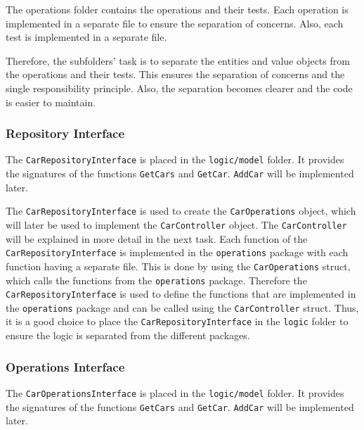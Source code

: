 The operations folder contains the operations and their tests.
Each operation is implemented in a separate file to ensure the separation of concerns.
Also, each test is implemented in a separate file.

Therefore, the subfolders' task is to separate the entities and value objects from the operations and their tests.
This ensures the separation of concerns and the single responsibility principle.
Also, the separation becomes clearer and the code is easier to maintain.

\subsubsection*{Repository Interface}
The \texttt{CarRepositoryInterface} is placed in the \texttt{logic/model} folder.
It provides the signatures of the functions \texttt{GetCars} and \texttt{GetCar}.
\texttt{AddCar} will be implemented later.

The \texttt{CarRepositoryInterface} is used to create the \texttt{CarOperations} object, which will later be used to implement the \texttt{CarController} object.
The \texttt{CarController} will be explained in more detail in the next task.
Each function of the \texttt{CarRepositoryInterface} is implemented in the \texttt{operations} package with each function having a separate file.
This is done by using the \texttt{CarOperations} struct, which calls the functions from the \texttt{operations} package.
Therefore the \texttt{CarRepositoryInterface} is used to define the functions that are implemented in the \texttt{operations} package and can be called using the \texttt{CarController} struct.
Thus, it is a good choice to place the \texttt{CarRepositoryInterface} in the \texttt{logic} folder to ensure the logic is separated from the different packages.

\subsubsection*{Operations Interface}
\label{sec:operationsInterface}
The \texttt{CarOperationsInterface} is placed in the \texttt{logic/model} folder.
It provides the signatures of the functions \texttt{GetCars} and \texttt{GetCar}.
\texttt{AddCar} will be implemented later.

